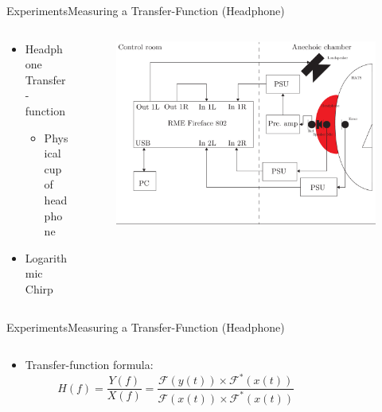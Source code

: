 \begin{frame}{Experiments}{Measuring a Transfer-Function (Headphone)}		
	\begin{columns}
		\begin{column}{0.5\textwidth}
			\begin{itemize}
				\item Headphone Transfer-function
				\begin{itemize}
					\item Physical cup of headphone
				\end{itemize}
				\item{Logarithmic Chirp}
			\end{itemize}
		\end{column}
		\begin{column}{0.5\textwidth} 
			\begin{figure}[h]
				\includegraphics[width=1\textwidth]{figures/AngleOfIncidenceSetup.pdf}
			\end{figure}
		\end{column}
	\end{columns}
\end{frame}

\begin{frame}{Experiments}{Measuring a Transfer-Function (Headphone)}		
	\begin{columns}
		\begin{column}{0.5\textwidth}
			\begin{itemize}
				\item Transfer-function formula:
				\begin{equation*}
				H(f)=\frac{Y(f)}{X(f)}=\frac{\mathscr{F}(y(t))\times\mathscr{F}^{\ast}(x(t))}{\mathscr{F}(x(t))\times\mathscr{F}^{\ast}(x(t))}
				\end{equation*}
			\end{itemize}
		\end{column}
		\begin{column}{0.5\textwidth} 
		\end{column}
	\end{columns}
\end{frame}

